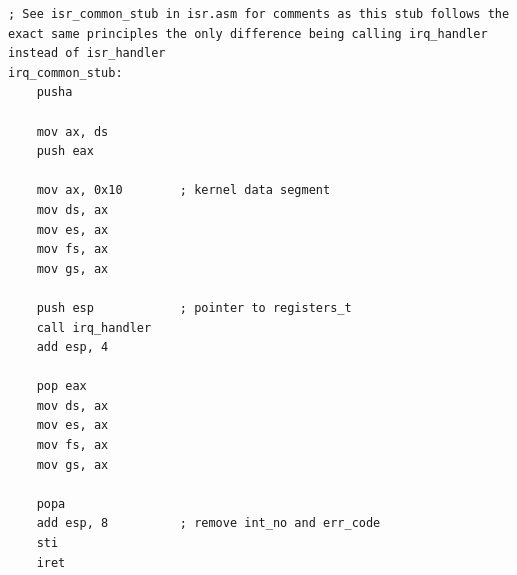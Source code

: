 \documentclass[../main.tex]{subfiles}
\begin{document}
\begin{verbatim}
; See isr_common_stub in isr.asm for comments as this stub follows the exact same principles the only difference being calling irq_handler instead of isr_handler
irq_common_stub:
    pusha

    mov ax, ds
    push eax

    mov ax, 0x10        ; kernel data segment
    mov ds, ax
    mov es, ax
    mov fs, ax
    mov gs, ax

    push esp            ; pointer to registers_t
    call irq_handler
    add esp, 4

    pop eax
    mov ds, ax
    mov es, ax
    mov fs, ax
    mov gs, ax

    popa
    add esp, 8          ; remove int_no and err_code
    sti
    iret

\end{verbatim}
\end{document}
